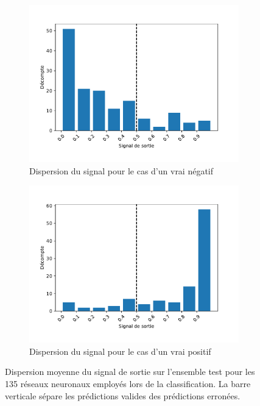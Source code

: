 \documentclass{article}
\begin{document}
\begin{figure}[H]
	\centering
	\begin{subfigure}{.8\textwidth}
		\centering
		\includegraphics[scale=0.45]{imgs/neg_distri.pdf}
		\caption{Dispersion du signal pour le cas d'un vrai négatif}
	\end{subfigure}
	\begin{subfigure}{.8\textwidth}
		\centering
		\includegraphics[scale=0.45]{imgs/pos_distri.pdf}
		\caption{Dispersion du signal pour le cas d'un vrai positif}
	\end{subfigure}
	\caption{Dispersion moyenne du signal de sortie sur l'ensemble test pour les 135 réseaux neuronaux employés lors de la classification. La barre verticale sépare les prédictions valides des prédictions erronées.}
	\label{fig:dispersion_signal}
\end{figure}
\end{document}
